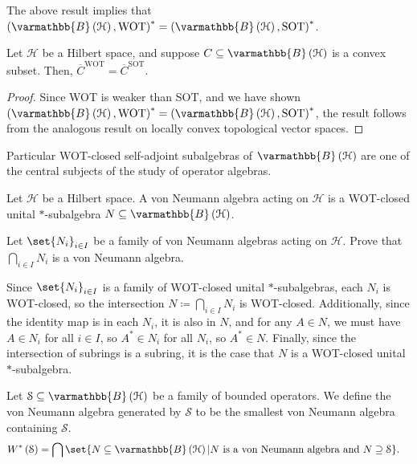 \documentclass[10pt]{mypackage}
\renewcommand*{\mathbb}[1]{\varmathbb{#1}}
\newcommand{\B}{\mathbb{B}}
\begin{document}
\begin{remark}
  The above result implies that $\left(\B\left(\mathcal{H}\right),\text{WOT}\right)^{\ast} = \left(\B\left(\mathcal{H}\right),\text{SOT}\right)^{\ast}$.
\end{remark}

\begin{corollary}
  Let $\mathcal{H}$ be a Hilbert space, and suppose $C\subseteq \B\left(\mathcal{H}\right)$ is a convex subset. Then, $\overline{C}^{\text{WOT}} = \overline{C}^{\text{SOT}}$.
\end{corollary}
\begin{proof}
  Since WOT is weaker than SOT, and we have shown $\left(\B\left(\mathcal{H}\right),\text{WOT}\right)^{\ast} = \left(\B\left(\mathcal{H}\right),\text{SOT}\right)^{\ast}$, the result follows from the analogous result on locally convex topological vector spaces.
\end{proof}
Particular WOT-closed self-adjoint subalgebras of $\B\left(\mathcal{H}\right)$ are one of the central subjects of the study of operator algebras. 
\begin{definition}
  Let $\mathcal{H}$ be a Hilbert space. A von Neumann algebra acting on $\mathcal{H}$ is a WOT-closed unital $\ast$-subalgebra $N\subseteq \B\left(\mathcal{H}\right)$.
\end{definition}
\begin{exercise}
  Let $\set{N_i}_{i\in I}$ be a family of von Neumann algebras acting on $\mathcal{H}$. Prove that $\bigcap_{i\in I}N_i$ is a von Neumann algebra.
\end{exercise}
\begin{solution}
  Since $\set{N_i}_{i\in I}$ is a family of WOT-closed unital $\ast$-subalgebras, each $N_i$ is WOT-closed, so the intersection $N \coloneq \bigcap_{i\in I}N_i$ is WOT-closed. Additionally, since the identity map is in each $N_i$, it is also in $N$, and for any $A\in N$, we must have $A\in N_i$ for all $i\in I$, so $A^{\ast}\in N_i$ for all $N_i$, so $A^{\ast}\in N$. Finally, since the intersection of subrings is a subring, it is the case that $N$ is a WOT-closed unital $\ast$-subalgebra.
\end{solution}
\begin{example}
  Let $\mathcal{S} \subseteq \B\left(\mathcal{H}\right)$ be a family of bounded operators. We define the von Neumann algebra generated by $\mathcal{S}$ to be the smallest von Neumann algebra containing $\mathcal{S}$.
  \begin{align*}
    W^{\ast}\left(\mathcal{S}\right) &= \bigcap\set{N\subseteq \B\left(\mathcal{H}\right) | N\text{ is a von Neumann algebra and }N\supseteq \mathcal{S}}.
  \end{align*}
\end{example}
\end{document}
